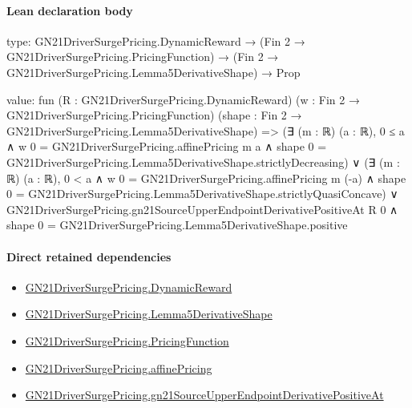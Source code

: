 \documentclass[10pt]{article}
\begin{document}
\paragraph{Lean declaration body}
\begin{ReviewVerbatim}
type:
GN21DriverSurgePricing.DynamicReward →
  (Fin 2 → GN21DriverSurgePricing.PricingFunction) → (Fin 2 → GN21DriverSurgePricing.Lemma5DerivativeShape) → Prop

value:
fun (R : GN21DriverSurgePricing.DynamicReward) (w : Fin 2 → GN21DriverSurgePricing.PricingFunction)
    (shape : Fin 2 → GN21DriverSurgePricing.Lemma5DerivativeShape) =>
  (∃ (m : ℝ) (a : ℝ),
      0 ≤ a ∧
        w 0 = GN21DriverSurgePricing.affinePricing m a ∧
          shape 0 = GN21DriverSurgePricing.Lemma5DerivativeShape.strictlyDecreasing) ∨
    (∃ (m : ℝ) (a : ℝ),
        0 < a ∧
          w 0 = GN21DriverSurgePricing.affinePricing m (-a) ∧
            shape 0 = GN21DriverSurgePricing.Lemma5DerivativeShape.strictlyQuasiConcave) ∨
      GN21DriverSurgePricing.gn21SourceUpperEndpointDerivativePositiveAt R 0 ∧
        shape 0 = GN21DriverSurgePricing.Lemma5DerivativeShape.positive
\end{ReviewVerbatim}

\paragraph{Direct retained dependencies}
\begin{itemize}\raggedright
\item \hyperlink{governing-declaration-44499c14a74f0062}{GN21\allowbreak{}Driver\allowbreak{}Surge\allowbreak{}Pricing.\allowbreak{}Dynamic\allowbreak{}Reward}
\item \hyperlink{paper-prerequisite-bdf8218f91905191}{GN21\allowbreak{}Driver\allowbreak{}Surge\allowbreak{}Pricing.\allowbreak{}Lemma5\allowbreak{}Derivative\allowbreak{}Shape}
\item \hyperlink{governing-declaration-9ab0ab344da5df05}{GN21\allowbreak{}Driver\allowbreak{}Surge\allowbreak{}Pricing.\allowbreak{}Pricing\allowbreak{}Function}
\item \hyperlink{governing-declaration-a54e8ecb850e1c90}{GN21\allowbreak{}Driver\allowbreak{}Surge\allowbreak{}Pricing.\allowbreak{}affine\allowbreak{}Pricing}
\item \hyperlink{governing-declaration-554ca314fb395a04}{GN21\allowbreak{}Driver\allowbreak{}Surge\allowbreak{}Pricing.\allowbreak{}gn21\allowbreak{}Source\allowbreak{}Upper\allowbreak{}Endpoint\allowbreak{}Derivative\allowbreak{}Positive\allowbreak{}At}
\end{itemize}
\hypertarget{governing-declaration-8277bb51bc9219db}{}
\end{document}
